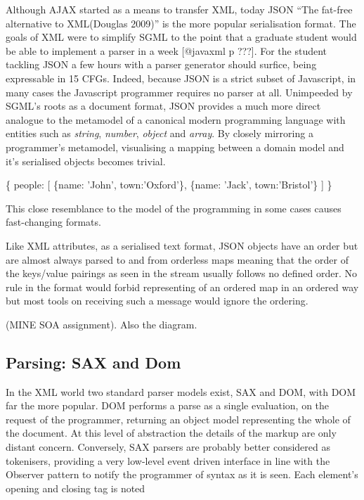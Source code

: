 \documentclass[]{article}
\newenvironment{Shaded}{}{}
\newcommand{\DataTypeTok}[1]{\textcolor[rgb]{0.56,0.13,0.00}{{#1}}}
\newcommand{\StringTok}[1]{\textcolor[rgb]{0.25,0.44,0.63}{{#1}}}
\newcommand{\NormalTok}[1]{{#1}}
\begin{document}
Although AJAX started as a means to transfer XML, today JSON ``The
fat-free alternative to XML(Douglas 2009)'' is the more popular
serialisation format. The goals of XML were to simplify SGML to the
point that a graduate student would be able to implement a parser in a
week {[}@javaxml p ???{]}. For the student tackling JSON a few hours
with a parser generator should surfice, being expressable in 15 CFGs.
Indeed, because JSON is a strict subset of Javascript, in many cases the
Javascript programmer requires no parser at all. Unimpeeded by SGML's
roots as a document format, JSON provides a much more direct analogue to
the metamodel of a canonical modern programming language with entities
such as \emph{string}, \emph{number}, \emph{object} and \emph{array}. By
closely mirroring a programmer's metamodel, visualising a mapping
between a domain model and it's serialised objects becomes trivial.

\begin{Shaded}
\begin{Highlighting}[]
\NormalTok{\{}
   \DataTypeTok{people}\NormalTok{: [}
      \NormalTok{\{}\DataTypeTok{name}\NormalTok{: }\StringTok{'John'}\NormalTok{, }\DataTypeTok{town}\NormalTok{:}\StringTok{'Oxford'}\NormalTok{\},}
      \NormalTok{\{}\DataTypeTok{name}\NormalTok{: }\StringTok{'Jack'}\NormalTok{, }\DataTypeTok{town}\NormalTok{:}\StringTok{'Bristol'}\NormalTok{\}}
   \NormalTok{]}
\NormalTok{\}}
\end{Highlighting}
\end{Shaded}

This close resemblance to the model of the programming in some cases
causes fast-changing formats.

Like XML attributes, as a serialised text format, JSON objects have an
order but are almost always parsed to and from orderless maps meaning
that the order of the keys/value pairings as seen in the stream usually
follows no defined order. No rule in the format would forbid
representing of an ordered map in an ordered way but most tools on
receiving such a message would ignore the ordering.

(MINE SOA assignment). Also the diagram.

\subsection{Parsing: SAX and Dom}

In the XML world two standard parser models exist, SAX and DOM, with DOM
far the more popular. DOM performs a parse as a single evaluation, on
the request of the programmer, returning an object model representing
the whole of the document. At this level of abstraction the details of
the markup are only distant concern. Conversely, SAX parsers are
probably better considered as tokenisers, providing a very low-level
event driven interface in line with the Observer pattern to notify the
programmer of syntax as it is seen. Each element's opening and closing
tag is noted
\end{document}
